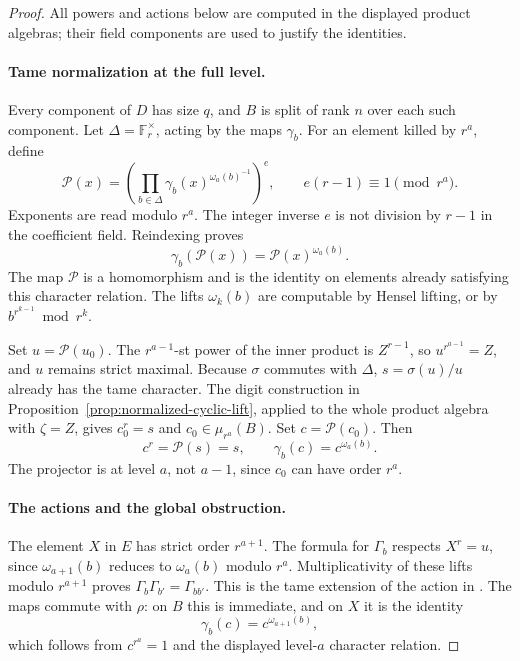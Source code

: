 \documentclass[11pt]{article}
\theoremstyle{definition}
\theoremstyle{remark}
\begin{document}
\begin{proof}
All powers and actions below are computed in the displayed product
algebras; their field components are used to justify the identities.

\paragraph{Tame normalization at the full level.}
Every component of \(D\) has size \(q\), and \(B\) is split of
rank \(n\) over each such component.
Let \(\Delta=\mathbb F_r^\times\), acting by the maps \(\gamma_b\).
For an element killed by \(r^a\), define
\[
 \mathcal P(x)=
 \left(\prod_{b\in\Delta}
           \gamma_b(x)^{\omega_a(b)^{-1}}\right)^e,
                  \qquad e(r-1)\equiv1\pmod{r^a}.
\]
Exponents are read modulo \(r^a\).
The integer inverse \(e\) is not division by \(r-1\) in
the coefficient field.
Reindexing proves
\[
              \gamma_b(\mathcal P(x))
                   =\mathcal P(x)^{\omega_a(b)}.
\]
The map \(\mathcal P\) is a homomorphism and is the identity on
elements already satisfying this character relation.
The lifts \(\omega_k(b)\) are computable by Hensel lifting, or by
\(b^{r^{k-1}}\bmod r^k\).

Set \(u=\mathcal P(u_0)\).
The \(r^{a-1}\)-st power of the inner product is \(Z^{r-1}\),
so \(u^{r^{a-1}}=Z\), and \(u\) remains strict maximal.
Because \(\sigma\) commutes with \(\Delta\),
\(s=\sigma(u)/u\) already has the tame character.
The digit construction in
Proposition~\ref{prop:normalized-cyclic-lift}, applied to the
whole product algebra with \(\zeta=Z\), gives
\(c_0^r=s\) and \(c_0\in\mu_{r^a}(B)\).
Set \(c=\mathcal P(c_0)\).  Then
\[
                     c^r=\mathcal P(s)=s,\qquad
                     \gamma_b(c)=c^{\omega_a(b)}.
\]
The projector is at level \(a\), not \(a-1\), since \(c_0\)
can have order \(r^a\).

\paragraph{The actions and the global obstruction.}
The element \(X\) in \(E\) has strict order \(r^{a+1}\).
The formula for \(\Gamma_b\) respects \(X^r=u\), since
\(\omega_{a+1}(b)\) reduces to \(\omega_a(b)\) modulo \(r^a\).
Multiplicativity of these lifts modulo \(r^{a+1}\) proves
\(\Gamma_b\Gamma_{b'}=\Gamma_{bb'}\).
This is the tame extension of the action in
\citet[Proposition~(4.3), printed p.~337]{Lenstra1991}.
The maps commute with \(\rho\): on \(B\) this is immediate, and
on \(X\) it is the identity
\[
                 \gamma_b(c)=c^{\omega_{a+1}(b)},
\]
which follows from \(c^{r^a}=1\) and the displayed level-\(a\)
character relation.


\end{proof}
\end{document}
